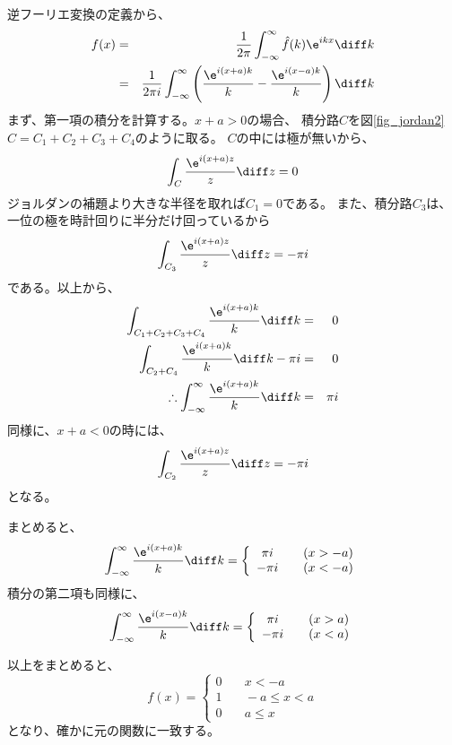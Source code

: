 逆フーリエ変換の定義から、
\begin{eqnarray}
  f(x) &=& \frac{1}{2\pi} \int_{-\infty}^{\infty} \hat{f}(k) \e^{ikx} \diff k \\
  &=& \frac{1}{2\pi i}\int_{-\infty}^{\infty} \left( \frac{\e^{i(x+a)k}}{k} - \frac{\e^{i(x-a)k}}{k} \right) \diff k
\end{eqnarray}
まず、第一項の積分を計算する。$x+a>0$の場合、
積分路$C$を図\ref{fig_jordan2}
$C = C_1 + C_2 + C_3 + C_4$のように取る。
$C$の中には極が無いから、
\begin{equation}
  \int_{C} \frac{\e^{i(x+a)z}}{z} \diff z = 0
\end{equation}
ジョルダンの補題より大きな半径を取れば$C_1= 0$である。
また、積分路$C_3$は、一位の極を時計回りに半分だけ回っているから
\begin{equation}
  \int_{C_3} \frac{\e^{i(x+a)z}}{z} \diff z = - \pi i
\end{equation}
である。以上から、
\begin{eqnarray}
  \int_{C_1+C_2+C_3+C_4} \frac{\e^{i(x+a)k}}{k} \diff k &= &0 \\
  \int_{C_2+C_4} \frac{\e^{i(x+a)k}}{k} \diff k - \pi i &= &0 \\
  \therefore \int_{-\infty}^{\infty} \frac{\e^{i(x+a)k}}{k} \diff k &=& \pi i
\end{eqnarray}
同様に、$x+a <0$の時には、
\begin{equation}
  \int_{C_2} \frac{\e^{i(x+a)z}}{z} \diff z = - \pi i
\end{equation}
となる。

まとめると、
\begin{equation}
  \int_{-\infty}^{\infty} \frac{\e^{i(x+a)k}}{k} \diff k =
  \left\{
  \begin{array}{cc}
    \pi i  & \quad (x > -a) \\
    -\pi i & \quad (x < -a)
  \end{array}
  \right.
\end{equation}
積分の第二項も同様に、
\begin{equation}
  \int_{-\infty}^{\infty} \frac{\e^{i(x-a)k}}{k} \diff k =
  \left\{
  \begin{array}{cc}
    \pi i  & \quad (x>a) \\
    -\pi i & \quad (x<a)
  \end{array}
  \right.
\end{equation}

以上をまとめると、
\begin{equation}
  f(x) = \left\{
  \begin{array}{cc}
    0 & \quad x < -a        \\
    1 & \quad -a \leq x < a \\
    0 & \quad a \leq x
  \end{array}
  \right.
\end{equation}
となり、確かに元の関数に一致する。

